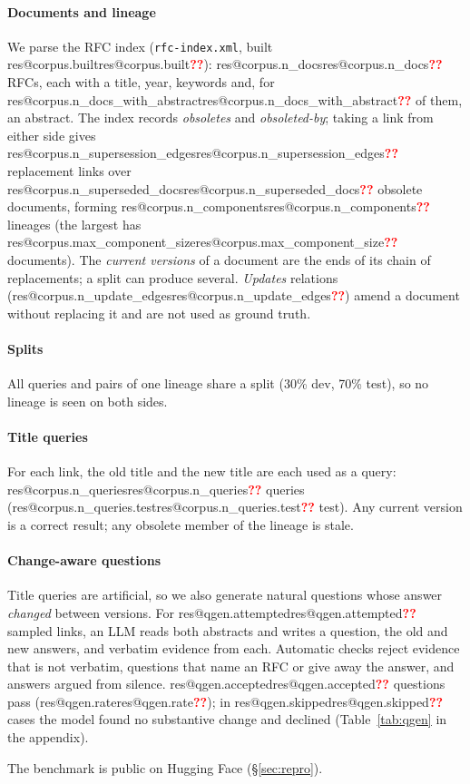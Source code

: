 \documentclass[11pt,a4paper]{article}
\makeatletter
\newcommand{\res}[1]{\ifcsname res@#1\endcsname\csname res@#1\endcsname\else\textcolor{red}{\textbf{??}}\fi}
\newcommand{\code}[1]{\texttt{\small #1}}
\makeatother
\begin{document}
\paragraph{Documents and lineage} We parse the RFC index (\code{rfc-index.xml},
built \res{corpus.built}): \res{corpus.n_docs} RFCs, each with a title, year,
keywords and, for \res{corpus.n_docs_with_abstract} of them, an abstract. The
index records \emph{obsoletes} and \emph{obsoleted-by}; taking a link from either
side gives \res{corpus.n_supersession_edges} replacement links over
\res{corpus.n_superseded_docs} obsolete documents, forming
\res{corpus.n_components} lineages (the largest has
\res{corpus.max_component_size} documents). The \emph{current versions} of a
document are the ends of its chain of replacements; a split can produce several.
\emph{Updates} relations (\res{corpus.n_update_edges}) amend a document without
replacing it and are not used as ground truth.

\paragraph{Splits} All queries and pairs of one lineage share a split (30\% dev,
70\% test), so no lineage is seen on both sides.

\paragraph{Title queries} For each link, the old title and the new title are each
used as a query: \res{corpus.n_queries} queries (\res{corpus.n_queries.test} test).
Any current version is a correct result; any obsolete member of the lineage is stale.

\paragraph{Change-aware questions} Title queries are artificial, so we also
generate natural questions whose answer \emph{changed} between versions. For
\res{qgen.attempted} sampled links, an LLM reads both abstracts and writes a
question, the old and new answers, and verbatim evidence from each. Automatic
checks reject evidence that is not verbatim, questions that name an RFC or give
away the answer, and answers argued from silence. \res{qgen.accepted} questions
pass (\res{qgen.rate}); in \res{qgen.skipped} cases the model found no
substantive change and declined (Table~\ref{tab:qgen} in the appendix).

The benchmark is public on Hugging Face (\S\ref{sec:repro}).
\end{document}

